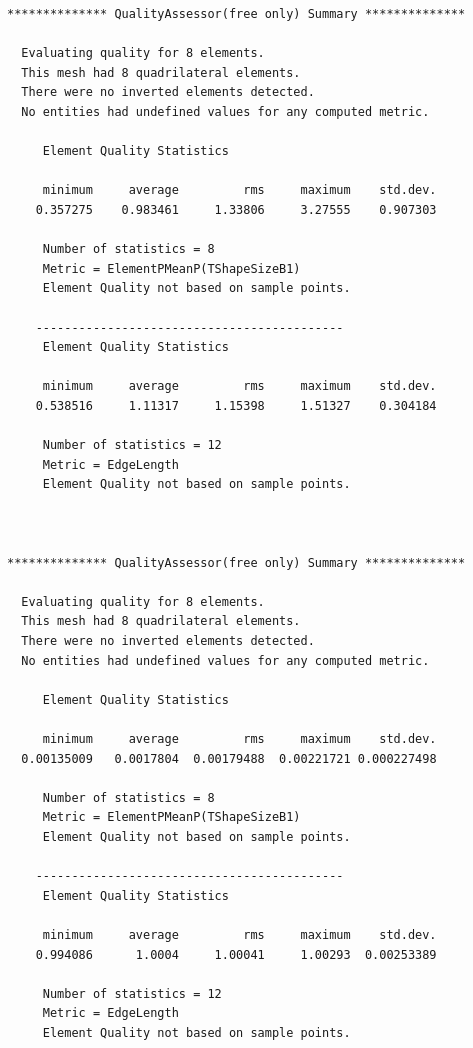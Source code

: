 \begin{verbatim}
************** QualityAssessor(free only) Summary **************

  Evaluating quality for 8 elements.
  This mesh had 8 quadrilateral elements.
  There were no inverted elements detected.
  No entities had undefined values for any computed metric.

     Element Quality Statistics

     minimum     average         rms     maximum    std.dev.
    0.357275    0.983461     1.33806     3.27555    0.907303

     Number of statistics = 8
     Metric = ElementPMeanP(TShapeSizeB1)
     Element Quality not based on sample points.

    -------------------------------------------
     Element Quality Statistics

     minimum     average         rms     maximum    std.dev.
    0.538516     1.11317     1.15398     1.51327    0.304184

     Number of statistics = 12
     Metric = EdgeLength
     Element Quality not based on sample points.



************** QualityAssessor(free only) Summary **************

  Evaluating quality for 8 elements.
  This mesh had 8 quadrilateral elements.
  There were no inverted elements detected.
  No entities had undefined values for any computed metric.

     Element Quality Statistics

     minimum     average         rms     maximum    std.dev.
  0.00135009   0.0017804  0.00179488  0.00221721 0.000227498

     Number of statistics = 8
     Metric = ElementPMeanP(TShapeSizeB1)
     Element Quality not based on sample points.

    -------------------------------------------
     Element Quality Statistics

     minimum     average         rms     maximum    std.dev.
    0.994086      1.0004     1.00041     1.00293  0.00253389

     Number of statistics = 12
     Metric = EdgeLength
     Element Quality not based on sample points.
\end{verbatim}


